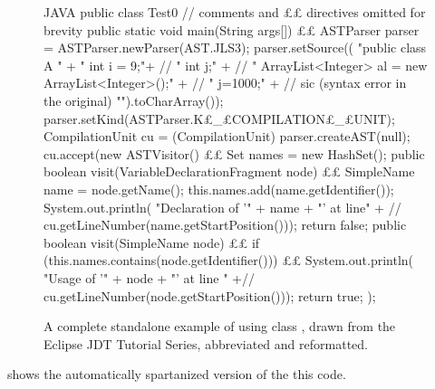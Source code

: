 \begin{figure}[H]
  \caption{A complete standalone example of using class , drawn
    from the Eclipse JDT Tutorial Series, abbreviated and reformatted.} \label{figure:eclipse}
    \begin{adjustbox}{max width=\columnwidth}
      \begin{code}[minipage, width=1.13\columnwidth]{JAVA}
public class Test0 { // comments and ££ directives omitted for brevity
  public static void main(String args[]) {££
    ASTParser parser = ASTParser.newParser(AST.JLS3);
    parser.setSource((
      "public class A {\n" +
      " int i = 9;\n"+ //
      " int j;\n" + //
      " ArrayList<Integer> al = new ArrayList<Integer>();\n" + //
      " j=1000;\n" + // sic (syntax error in the original)
      "}\n").toCharArray());
    parser.setKind(ASTParser.K£\_£COMPILATION£\_£UNIT);
    CompilationUnit cu = (CompilationUnit) parser.createAST(null);
    cu.accept(new ASTVisitor() {££
      Set names = new HashSet();
      public boolean visit(VariableDeclarationFragment node) {££
        SimpleName name = node.getName();
        this.names.add(name.getIdentifier());
        System.out.println(
          "Declaration of '" + name + "' at line" + //
          cu.getLineNumber(name.getStartPosition()));
        return false;
      }
      public boolean visit(SimpleName node) {££
        if (this.names.contains(node.getIdentifier())) {££
          System.out.println(
            "Usage of '" + node + "' at line " +//
            cu.getLineNumber(node.getStartPosition()));
        }
        return true;
      }
    });
  }
}
\end{code}
  \end{adjustbox}
\end{figure}

 shows the automatically spartanized version of
the this code.

